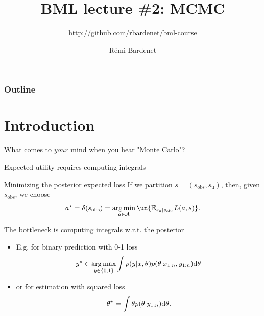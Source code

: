 \documentclass[10pt]{beamer}
\title[Bayesian ML: Bayesics]{BML lecture \#2: MCMC}
\subtitle{\url{http://github.com/rbardenet/bml-course}}
\author[Rémi Bardenet (CNRS \& Univ. Lille)] %
{Rémi Bardenet}
\institute[] %
{
  CNRS \& CRIStAL, Univ. Lille, France\\
\vspace{1cm}
\texttt{[image: /Users/rbardenet/Work/Tex/PosterImages/logoCNRS.pdf]}
\qquad \texttt{[image: /Users/rbardenet/Work/Tex/PosterImages/cristalLogo.pdf]}
}
\date{}
\begin{document}
\begin{frame}
\maketitle
\end{frame}

\begin{frame}
\frametitle{Outline}
\tableofcontents
\end{frame}

\section{Introduction}

\begin{frame}{What comes to $your$ mind when you hear "Monte Carlo"?}
\end{frame}

\begin{frame}{Expected utility requires computing integrals}
  \begin{block}{Minimizing the posterior expected loss}
  If we partition $s=(s_{\text{obs}}, s_{\text{u}})$, then, given $s_\text{obs}$, we choose
  $$
  a^\star = \delta(s_\text{obs}) = \argmin_{a\in\mathcal{A}} \un{\mathbb{E}_{s_{\text{u}}\vert s_{\text{obs}}} L(a,s)}.
  $$
\end{block}

  \begin{alertblock}{The bottleneck is computing integrals w.r.t. the posterior}
  \begin{itemize}
    \item E.g. for binary prediction with 0-1 loss
    $$
    y^\star \in \operatorname*{arg\,max}_{y\in\{0,1\}} \int p(y\vert x,\theta) p(\theta\vert x_{1:n}, y_{1:n}) {\rm d}\theta
    $$
    \item or for estimation with squared loss
    $$
    \theta^\star = \int \theta p(\theta\vert y_{1:n}) {\rm d}\theta.
    $$
  \end{itemize}
\end{alertblock}
\end{frame}
\end{document}
